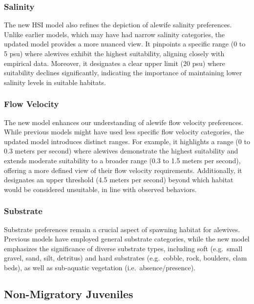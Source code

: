 \documentclass[
]{book}
\begin{document}
\hypertarget{salinity-3}{%
\subsubsection{Salinity}\label{salinity-3}}

The new HSI model also refines the depiction of alewife salinity preferences.
Unlike earlier models, which may have had narrow salinity categories, the updated model provides a more nuanced view.
It pinpoints a specific range (0 to 5 psu) where alewives exhibit the highest suitability, aligning closely with empirical data.
Moreover, it designates a clear upper limit (20 psu) where suitability declines significantly, indicating the importance of maintaining lower salinity levels in suitable habitats.

\hypertarget{flow-velocity-3}{%
\subsubsection{Flow Velocity}\label{flow-velocity-3}}

The new model enhances our understanding of alewife flow velocity preferences.
While previous models might have used less specific flow velocity categories, the updated model introduces distinct ranges.
For example, it highlights a range (0 to 0.3 meters per second) where alewives demonstrate the highest suitability and extends moderate suitability to a broader range (0.3 to 1.5 meters per second), offering a more defined view of their flow velocity requirements.
Additionally, it designates an upper threshold (4.5 meters per second) beyond which habitat would be considered unsuitable, in line with observed behaviors.

\hypertarget{substrate-3}{%
\subsubsection{Substrate}\label{substrate-3}}

Substrate preferences remain a crucial aspect of spawning habitat for alewives.
Previous models have employed general substrate categories, while the new model emphasizes the significance of diverse substrate types, including soft (e.g.~small gravel, sand, silt, detritus) and hard substrates (e.g.~cobble, rock, boulders, clam beds), as well as sub-aquatic vegetation (i.e.~absence/presence).

\hypertarget{non-migratory-juveniles-1}{%
\subsection{Non-Migratory Juveniles}\label{non-migratory-juveniles-1}}
\end{document}
